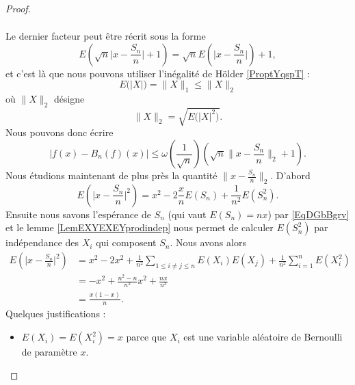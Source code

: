 \begin{proof}
\begin{enumerate}
\begin{subequations}
\begin{align}
            \end{align}
        \end{subequations}
        Le dernier facteur peut être récrit sous la forme
        \begin{equation}
            E\left( \sqrt{n}\big| x-\frac{ S_n }{ n } \big|+1 \right)=\sqrt{n}E\left( \big| x-\frac{ S_n }{ n } \big| \right)+1,
        \end{equation}
        et c'est là que nous pouvons utiliser l'inégalité de Hölder \ref{ProptYqspT} :
        \begin{equation}
            E\big( | X | \big)=\| X \|_1\leq\| X \|_2
        \end{equation}
        où \( \| X \|_2\) désigne
        \begin{equation}
            \| X \|_2=\sqrt{ E\big( | X |^2 \big)  }.
        \end{equation}
        Nous pouvons donc écrire
        \begin{equation}
            \big| f(x)-B_n(f)(x) \big|\leq \omega\left( \frac{1}{ \sqrt{n} } \right)\left( \sqrt{n}\big\| x-\frac{ S_n }{ n } \big\|_2+1 \right).
        \end{equation}
        Nous étudions maintenant de plus près la quantité \( \| x-\frac{ S_n }{ n } \|_2\). D'abord
        \begin{equation}
            E\left( \big| x-\frac{ S_n }{ n } \big|^2 \right)=x^2-2\frac{ x }{ n }E(S_n)+\frac{1}{ n^2 }E(S_n^2).
        \end{equation}
        Ensuite nous savons l'espérance de \( S_n\) (qui vaut \( E(S_n)=nx\)) par \eqref{EqDGbBgrv} et le lemme \ref{LemEXYEXEYprodindep} nous permet de calculer \( E(S_n^2)\) par indépendance des \( X_i\) qui composent \( S_n\). Nous avons alors
        \begin{subequations}
            \begin{align}
                E\left( \big| x-\frac{ S_n }{ n } \big|^2 \right)&=x^2-2x^2+\frac{1}{ n^2 }\sum_{1\leq i\neq j\leq n}E(X_i)E(X_j)+\frac{1}{ n^2 }\sum_{i=1}^nE(X_i^2)\\
                &=-x^2+\frac{ n^2-n }{ n^2 }x^2+\frac{ nx }{ n^2 }\\
                &=\frac{ x(1-x) }{ n }.
            \end{align}
        \end{subequations}
        Quelques justifications :
        \begin{itemize}
            \item \( E(X_i)=E(X_i^2)=x\) parce que \( X_i\) est une variable aléatoire de Bernoulli de paramètre \( x\).

\end{itemize}
\end{enumerate}
\end{proof}
